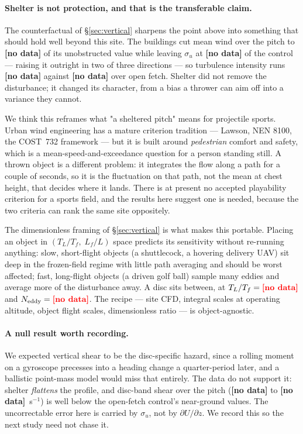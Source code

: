 \documentclass[11pt,letterpaper]{article}
\newcommand{\MISSINGNUM}{\textbf{\color{red}[no data]}}%
\newcommand{\VertUratioRange}{\MISSINGNUM}\newcommand{\VertSigRatioRange}{\MISSINGNUM}%
\newcommand{\VertTIpitchRange}{\MISSINGNUM}\newcommand{\VertTIcontrol}{\MISSINGNUM}%
\newcommand{\VertNeddyRange}{\MISSINGNUM}%
\newcommand{\VertShearBandHNineZero}{\MISSINGNUM}\newcommand{\VertShearBandHTwoOneZero}{\MISSINGNUM}%
\begin{document}
\paragraph{Shelter is not protection, and that is the transferable claim.}
The counterfactual of \S\ref{sec:vertical} sharpens the point above into
something that should hold well beyond this site. The buildings cut mean wind
over the pitch to \VertUratioRange{} of its unobstructed value while leaving
$\sigma_u$ at \VertSigRatioRange{} of the control --- raising it outright in two
of three directions --- so turbulence intensity runs \VertTIpitchRange{} against
\VertTIcontrol{} over open fetch. Shelter did not remove the disturbance; it
changed its character, from a bias a thrower can aim off into a variance they
cannot.

We think this reframes what "a sheltered pitch" means for projectile sports.
Urban wind engineering has a mature criterion tradition --- Lawson, NEN 8100,
the COST~732 framework --- but it is built around \emph{pedestrian} comfort and
safety, which is a mean-speed-and-exceedance question for a person standing
still. A thrown object is a different problem: it integrates the flow along a
path for a couple of seconds, so it is the fluctuation on that path, not the
mean at chest height, that decides where it lands. There is at present no
accepted playability criterion for a sports field, and the results here suggest
one is needed, because the two criteria can rank the same site oppositely.

The dimensionless framing of \S\ref{sec:vertical} is what makes this portable.
Placing an object in $(T_L/T_f,\; L_f/L)$ space predicts its sensitivity without
re-running anything: slow, short-flight objects (a shuttlecock, a hovering
delivery UAV) sit deep in the frozen-field regime with little path averaging and
should be worst affected; fast, long-flight objects (a driven golf ball) sample
many eddies and average more of the disturbance away. A disc sits between, at
$T_L/T_f = \VertTLratioRange{}$ and $N_{\text{eddy}} = \VertNeddyRange{}$. The
recipe --- site CFD, integral scales at operating altitude, object flight
scales, dimensionless ratio --- is object-agnostic.

\paragraph{A null result worth recording.} We expected vertical shear to be the
disc-specific hazard, since a rolling moment on a gyroscope precesses into a
heading change a quarter-period later, and a ballistic point-mass model would
miss that entirely. The data do not support it: shelter \emph{flattens} the
profile, and disc-band shear over the pitch (\VertShearBandHNineZero{} to
\VertShearBandHTwoOneZero{}~s$^{-1}$) is well below the open-fetch control's
near-ground values. The uncorrectable error here is carried by $\sigma_u$, not
by $\partial U/\partial z$. We record this so the next study need not chase it.
\end{document}
